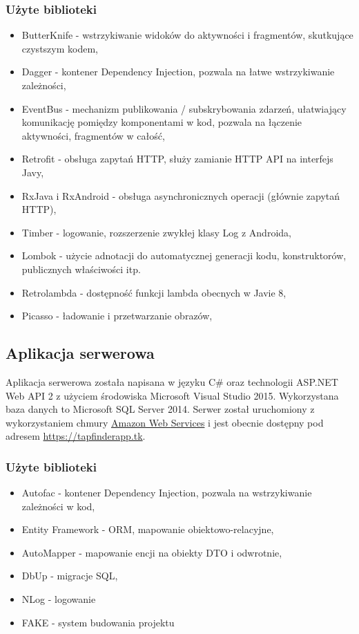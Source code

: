 \documentclass[a4paper]{article}
\begin{document}
\subsubsection{Użyte biblioteki}
\begin{itemize}
\item ButterKnife - wstrzykiwanie widoków do aktywności i fragmentów, skutkujące czystszym kodem,
\item Dagger - kontener Dependency Injection, pozwala na łatwe wstrzykiwanie zależności,
\item EventBus - mechanizm publikowania / subskrybowania zdarzeń, ułatwiający komunikację pomiędzy komponentami w kod, pozwala na łączenie aktywności, fragmentów w całość,
\item Retrofit - obsługa zapytań HTTP, służy zamianie HTTP API na interfejs Javy,
\item RxJava i RxAndroid - obsługa asynchronicznych operacji (głównie zapytań HTTP),
\item Timber - logowanie, rozszerzenie zwykłej klasy Log z Androida,
\item Lombok - użycie adnotacji do automatycznej generacji kodu, konstruktorów, publicznych właściwości itp. 
\item Retrolambda - dostępność funkcji lambda obecnych w Javie 8,
\item Picasso - ładowanie i przetwarzanie obrazów,
\end{itemize}

\subsection{Aplikacja serwerowa}
Aplikacja serwerowa została napisana w języku C\# oraz technologii ASP.NET Web API 2 z użyciem środowiska Microsoft Visual Studio 2015. Wykorzystana baza danych to Microsoft SQL Server 2014. Serwer został uruchomiony z wykorzystaniem chmury \href{https://aws.amazon.com/?nc2=h_lg}{Amazon Web Services} i jest obecnie dostępny pod adresem \url{https://tapfinderapp.tk}. 

\subsubsection{Użyte biblioteki}
\begin{itemize}
\item Autofac - kontener Dependency Injection, pozwala na wstrzykiwanie zależności w kod, 
\item Entity Framework - ORM, mapowanie obiektowo-relacyjne,
\item AutoMapper - mapowanie encji na obiekty DTO i odwrotnie,
\item DbUp - migracje SQL, 
\item NLog - logowanie
\item FAKE - system budowania projektu
\end{itemize}
\end{document}
